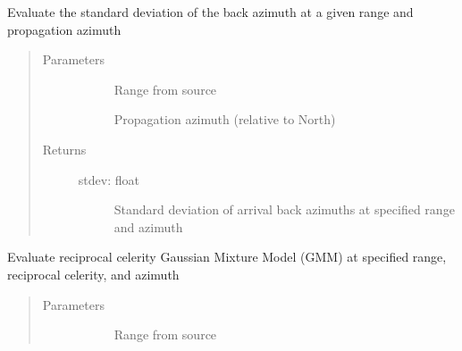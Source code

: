 \documentclass[letterpaper,10pt,english]{sphinxmanual}
\begin{document}
\begin{fulllineitems}
\begin{fulllineitems}
\label{\detokenize{stochprop.propagation:stochprop.propagation.PathGeometryModel.eval_az_dev_std}}
Evaluate the standard deviation of the back azimuth at a given range
and propagation azimuth
\begin{quote}\begin{description}
\item[{Parameters}] \leavevmode\begin{description}
\item[{}] \leavevmode
Range from source

\item[{}] \leavevmode
Propagation azimuth (relative to North)

\end{description}

\item[{Returns}] \leavevmode\begin{description}
\item[{stdev: float}] \leavevmode
Standard deviation of arrival back azimuths at specified range and azimuth

\end{description}

\end{description}\end{quote}

\end{fulllineitems}


\begin{fulllineitems}
\label{\detokenize{stochprop.propagation:stochprop.propagation.PathGeometryModel.eval_rcel_gmm}}
Evaluate reciprocal celerity Gaussian Mixture Model (GMM)
at specified range, reciprocal celerity, and azimuth
\begin{quote}\begin{description}
\item[{Parameters}] \leavevmode\begin{description}
\item[{}] \leavevmode
Range from source


\end{description}
\end{description}
\end{quote}
\end{fulllineitems}
\end{fulllineitems}
\end{document}
